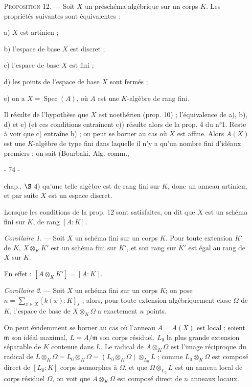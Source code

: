 \noindent \textsc{Proposition 12}. --- Soit $X$ un préschéma algébrique sur un corps $K$. Les propriétés suivantes sont équivalentes :

a) $X$ est artinien ;

b) l'espace de base $X$ est discret ;

c) l'espace de base $X$ est fini ;

d) les points de l'espace de base $X$ sont fermés ;

e) on a $X = \operatorname{Spec}(A)$, où $A$ est une $K$-algèbre de rang fini.

Il résulte de l'hypothèse que $X$ est noethérien (prop. 10) ; l'équivalence de a), b), d) et e) (et ces conditions entraînent e)) résulte alors de la prop. 4 du n°1. Reste à voir que c) entraîne b) ; on peut se borner au cas où $X$ est affine. Alors $A(X)$ est une $K$-algèbre de type fini dans laquelle il n'y a qu'un nombre fini d'idéaux premiers ; on sait (Bourbaki, Alg. comm.,

\newpage


- 74 -

chap., $\S$ 4) qu'une telle algèbre est de rang fini sur $K$, donc un anneau artinien, et par suite $X$ est un espace discret.

Lorsque les conditions de la prop. 12 sont satisfaites, on dit que $X$ est un schéma fini sur $K$, de rang $[A:K]$.

\emph{Corollaire 1}. — Soit $X$ un schéma fini sur un corps $K$. Pour toute extension $K'$ de $K$, $X \otimes_K K'$ est un schéma fini sur $K'$, et son rang sur $K'$ est égal au rang de $X$ sur $K$.

En effet : $[A \otimes_K K'] = [A:K]$.

\emph{Corollaire 2}. — Soit $X$ un schéma fini sur un corps $K$; on pose $n = \sum_{x \in X} [k(x):K]_s$ ; alors, pour toute extension algébriquement close $\Omega$ de $K$, l'espace de base de $X \otimes_K \Omega$ a exactement $n$ points.

On peut évidemment se borner au cas où l'anneau $A=A(X)$ est local ; soient $\mathfrak{m}$ son idéal maximal, $L = A/\mathfrak{m}$ son corps résiduel, $L_0$ la plus grande extension séparable de $K$ contenue dans $L$. Le radical de $A \otimes_K \Omega$ est l'image réciproque du radical de $L \otimes_K \Omega = L_0 \otimes_K \Omega = (L_0 \otimes_K \Omega) \otimes_{L_0} L$ ; comme $L_0 \otimes_K \Omega$ est composé direct de $[L_0:K]$ corps isomorphes à $\Omega$, et que $\Omega \otimes_{L_0} L$ est un anneau local de corps résiduel $\Omega$, on voit que $A \otimes_K \Omega$ est composé direct de $n$ anneaux locaux.

